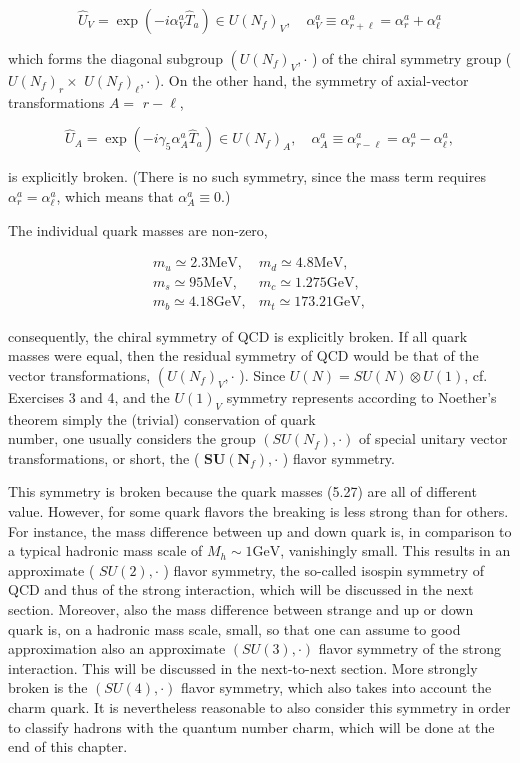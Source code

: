 \documentclass[10pt, letterpaper]{article}
\begin{document}
$$
\hat{U}_{V}=\exp \left(-i \alpha_{V}^{a} \hat{T}_{a}\right) \in U\left(N_{f}\right)_{V}, \quad \alpha_{V}^{a} \equiv \alpha_{r+\ell}^{a}=\alpha_{r}^{a}+\alpha_{\ell}^{a}
$$

which forms the diagonal subgroup $\left(U\left(N_{f}\right)_{V}, \cdot\right.$ ) of the chiral symmetry group ( $U\left(N_{f}\right)_{r} \times$ $U\left(N_{f}\right)_{\ell}, \cdot$ ). On the other hand, the symmetry of axial-vector transformations $A=$ $r-\ell$,

$$
\hat{U}_{A}=\exp \left(-i \gamma_{5} \alpha_{A}^{a} \hat{T}_{a}\right) \in U\left(N_{f}\right)_{A}, \quad \alpha_{A}^{a} \equiv \alpha_{r-\ell}^{a}=\alpha_{r}^{a}-\alpha_{\ell}^{a},
$$

is explicitly broken. (There is no such symmetry, since the mass term requires $\alpha_{r}^{a}=\alpha_{\ell}^{a}$, which means that $\alpha_{A}^{a} \equiv 0$.)

The individual quark masses are non-zero,

$$
\begin{array}{ll}
m_{u} \simeq 2.3 \mathrm{MeV}, & m_{d} \simeq 4.8 \mathrm{MeV}, \\
m_{s} \simeq 95 \mathrm{MeV}, & m_{c} \simeq 1.275 \mathrm{GeV}, \\
m_{b} \simeq 4.18 \mathrm{GeV}, & m_{t} \simeq 173.21 \mathrm{GeV},
\end{array}
$$

consequently, the chiral symmetry of QCD is explicitly broken. If all quark masses were equal, then the residual symmetry of QCD would be that of the vector transformations, $\left(U\left(N_{f}\right)_{V}, \cdot\right.$ ). Since $U(N)=S U(N) \otimes U(1)$, cf. Exercises 3 and 4, and the $U(1)_{V}$ symmetry represents according to Noether's theorem simply the (trivial) conservation of quark\\
number, one usually considers the group $\left(S U\left(N_{f}\right), \cdot\right)$ of special unitary vector transformations, or short, the ( $\boldsymbol{S U}\left(\boldsymbol{N}_{f}\right), \cdot$ ) flavor symmetry.

This symmetry is broken because the quark masses (5.27) are all of different value. However, for some quark flavors the breaking is less strong than for others. For instance, the mass difference between up and down quark is, in comparison to a typical hadronic mass scale of $M_{h} \sim 1 \mathrm{GeV}$, vanishingly small. This results in an approximate ( $S U(2), \cdot$ ) flavor symmetry, the so-called isospin symmetry of QCD and thus of the strong interaction, which will be discussed in the next section. Moreover, also the mass difference between strange and up or down quark is, on a hadronic mass scale, small, so that one can assume to good approximation also an approximate $(S U(3), \cdot)$ flavor symmetry of the strong interaction. This will be discussed in the next-to-next section. More strongly broken is the $(S U(4), \cdot)$ flavor symmetry, which also takes into account the charm quark. It is nevertheless reasonable to also consider this symmetry in order to classify hadrons with the quantum number charm, which will be done at the end of this chapter.
\end{document}
